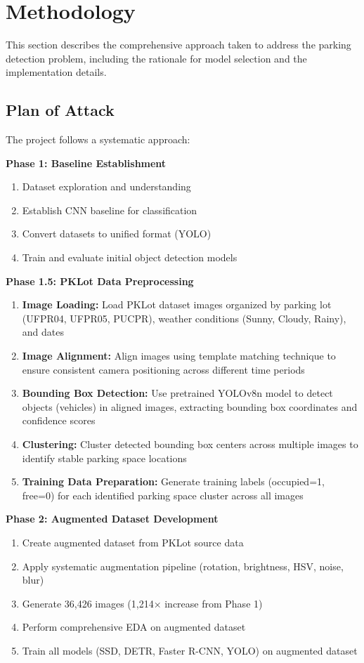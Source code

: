 \documentclass[12pt,a4paper]{article}
\begin{document}
\section{Methodology}

This section describes the comprehensive approach taken to address the parking detection problem, including the rationale for model selection and the implementation details.

\subsection{Plan of Attack}

The project follows a systematic approach:

\textbf{Phase 1: Baseline Establishment}
\begin{enumerate}
    \item Dataset exploration and understanding
    \item Establish CNN baseline for classification
    \item Convert datasets to unified format (YOLO)
    \item Train and evaluate initial object detection models
\end{enumerate}

\textbf{Phase 1.5: PKLot Data Preprocessing}
\begin{enumerate}
    \item \textbf{Image Loading:} Load PKLot dataset images organized by parking lot (UFPR04, UFPR05, PUCPR), weather conditions (Sunny, Cloudy, Rainy), and dates
    \item \textbf{Image Alignment:} Align images using template matching technique to ensure consistent camera positioning across different time periods
    \item \textbf{Bounding Box Detection:} Use pretrained YOLOv8n model to detect objects (vehicles) in aligned images, extracting bounding box coordinates and confidence scores
    \item \textbf{Clustering:} Cluster detected bounding box centers across multiple images to identify stable parking space locations
    \item \textbf{Training Data Preparation:} Generate training labels (occupied=1, free=0) for each identified parking space cluster across all images
\end{enumerate}

\textbf{Phase 2: Augmented Dataset Development}
\begin{enumerate}
    \item Create augmented dataset from PKLot source data
    \item Apply systematic augmentation pipeline (rotation, brightness, HSV, noise, blur)
    \item Generate 36,426 images (1,214× increase from Phase 1)
    \item Perform comprehensive EDA on augmented dataset
    \item Train all models (SSD, DETR, Faster R-CNN, YOLO) on augmented dataset
\end{enumerate}
\end{document}
